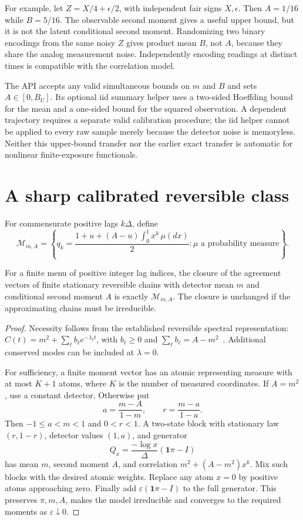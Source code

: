 For example, let $Z=X/4+\epsilon/2$, with independent fair signs $X,\epsilon$.
Then $A=1/16$ while $B=5/16$. The observable second moment gives a useful upper
bound, but it is not the latent conditional second moment. Randomizing two
binary encodings from the same noisy $Z$ gives product mean $B$, not $A$, because
they share the analog measurement noise. Independently encoding readings at
distinct times is compatible with the correlation model.

The API accepts any valid simultaneous bounds on $m$ and $B$ and sets
$A\in[0,B_U]$. Its optional iid summary helper uses a two-sided Hoeffding bound
for the mean and a one-sided bound for the squared observation. A dependent
trajectory requires a separate valid calibration procedure; the iid helper
cannot be applied to every raw sample merely because the detector noise is
memoryless. Neither this upper-bound transfer nor the earlier exact transfer
is automatic for nonlinear finite-exposure functionals.

\section{A sharp calibrated reversible class}
For commensurate positive lags $k\Delta$, define
\begin{equation}
 \mathcal M_{m,A}=\left\{
 q_k=\frac{1+u+(A-u)\int_0^1x^k\,\mu(dx)}2:
 \mu\text{ a probability measure}\right\}.
 \label{eq:ci-calibrated-cone}
\end{equation}

\begin{theorem}
For a finite menu of positive integer lag indices, the closure of the agreement
vectors of finite stationary reversible chains with detector mean $m$ and
conditional second moment $A$ is exactly $\mathcal M_{m,A}$. The closure is
unchanged if the approximating chains must be irreducible.
\end{theorem}
\begin{proof}
Necessity follows from the established reversible spectral representation:
$C(t)=m^2+\sum_\ell b_\ell e^{-\lambda_\ell t}$, with
$b_\ell\geq0$ and $\sum_\ell b_\ell=A-m^2$~\cite{vlAldousFill2002}.
Additional conserved modes can be included at $\lambda=0$.

For sufficiency, a finite moment vector has an atomic representing measure
with at most $K+1$ atoms, where $K$ is the number of measured coordinates. If
$A=m^2$, use a constant detector. Otherwise put
\[
 a=\frac{m-A}{1-m},\qquad r=\frac{m-a}{1-a}.
\]
Then $-1\leq a<m<1$ and $0<r<1$. A two-state block with stationary law
$(r,1-r)$, detector values $(1,a)$, and generator
\[
 Q_x=\frac{-\log x}{\Delta}(\boldsymbol1\pi-I)
\]
has mean $m$, second moment $A$, and correlation
$m^2+(A-m^2)x^k$. Mix such blocks with the desired atomic weights. Replace any
atom $x=0$ by positive atoms approaching zero. Finally add
$\varepsilon(\boldsymbol1\pi-I)$ to the full generator. This preserves
$\pi,m,A$, makes the model irreducible and converges to the required moments as
$\varepsilon\downarrow0$.
\end{proof}

